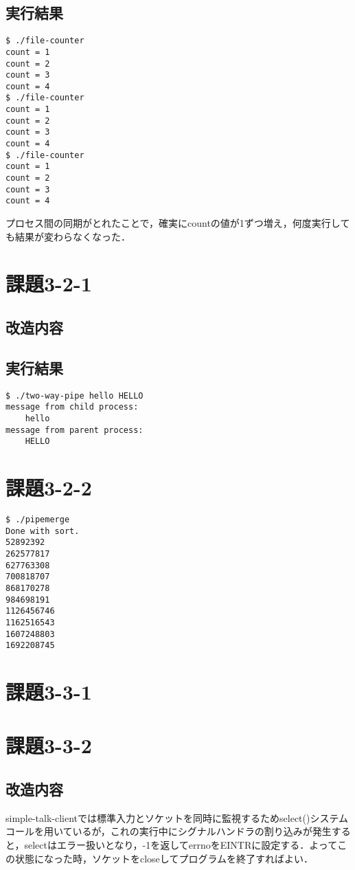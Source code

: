 \documentclass[a4j,10pt,titlepage]{jsarticle}
\begin{document}
\subsection{実行結果}
\begin{verbatim}
$ ./file-counter
count = 1
count = 2
count = 3
count = 4
$ ./file-counter
count = 1
count = 2
count = 3
count = 4
$ ./file-counter
count = 1
count = 2
count = 3
count = 4
\end{verbatim}

プロセス間の同期がとれたことで，確実にcountの値が1ずつ増え，何度実行しても結果が変わらなくなった．

\section{課題3-2-1}

\subsection{改造内容}

\subsection{実行結果}
\begin{verbatim}
$ ./two-way-pipe hello HELLO
message from child process: 
	hello
message from parent process: 
	HELLO
\end{verbatim}

\section{課題3-2-2}
\begin{verbatim}
$ ./pipemerge 
Done with sort.
52892392
262577817
627763308
700818707
868170278
984698191
1126456746
1162516543
1607248803
1692208745
\end{verbatim}

\section{課題3-3-1}
\section{課題3-3-2}

\subsection{改造内容}
simple-talk-clientでは標準入力とソケットを同時に監視するためselect()システムコールを用いているが，これの実行中にシグナルハンドラの割り込みが発生すると，selectはエラー扱いとなり，-1を返してerrnoをEINTRに設定する．よってこの状態になった時，ソケットをcloseしてプログラムを終了すればよい．
\end{document}
